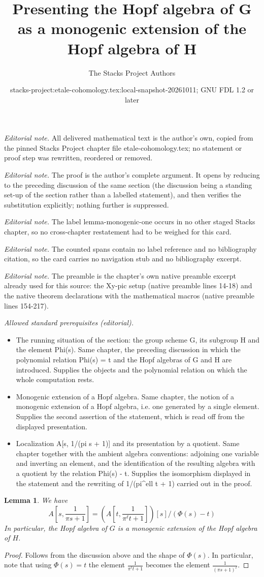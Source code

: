 \documentclass[10pt,a4paper]{amsart}
\title{Presenting the Hopf algebra of G as a monogenic extension of the Hopf algebra of H}
\author{The Stacks Project Authors}
\date{stacks-project:etale-cohomology.tex:local-snapshot-20261011; GNU FDL 1.2 or later}
\theoremstyle{plain}
\newtheorem{lemma}[subsection]{Lemma}
\theoremstyle{definition}
\theoremstyle{remark}
\numberwithin{equation}{subsection}
\begin{document}
\maketitle
\noindent\textit{Editorial note.} All delivered mathematical text is the author's own, copied from the pinned Stacks Project chapter file etale-cohomology.tex; no statement or proof step was rewritten, reordered or removed.\par\medskip
\noindent\textit{Editorial note.} The proof is the author's complete argument. It opens by reducing to the preceding discussion of the same section (the discussion being a standing set-up of the section rather than a labelled statement), and then verifies the substitution explicitly; nothing further is suppressed.\par\medskip
\noindent\textit{Editorial note.} The label lemma-monogenic-one occurs in no other staged Stacks chapter, so no cross-chapter restatement had to be weighed for this card.\par\medskip
\noindent\textit{Editorial note.} The counted spans contain no label reference and no bibliography citation, so the card carries no navigation stub and no bibliography excerpt.\par\medskip
\noindent\textit{Editorial note.} The preamble is the chapter's own native preamble excerpt already used for this source: the Xy-pic setup (native preamble lines 14-18) and the native theorem declarations with the mathematical macros (native preamble lines 154-217).\par\medskip
\noindent\textit{Allowed standard prerequisites (editorial).}\begin{itemize}
\item The running situation of the section: the group scheme G, its subgroup H and the element Phi(s). Same chapter, the preceding discussion in which the polynomial relation Phi(s) = t and the Hopf algebras of G and H are introduced. Supplies the objects and the polynomial relation on which the whole computation rests.
\item Monogenic extension of a Hopf algebra. Same chapter, the notion of a monogenic extension of a Hopf algebra, i.e. one generated by a single element. Supplies the second assertion of the statement, which is read off from the displayed presentation.
\item Localization A[s, 1/(pi s + 1)] and its presentation by a quotient. Same chapter together with the ambient algebra conventions: adjoining one variable and inverting an element, and the identification of the resulting algebra with a quotient by the relation Phi(s) - t. Supplies the isomorphism displayed in the statement and the rewriting of 1/(pi\textasciicircum{}ell t + 1) carried out in the proof.
\end{itemize}\medskip
\begin{lemma}
\label{lemma-monogenic-one}
We have
$$
A[s, \frac{1}{\pi s + 1}] =
\left(A[t, \frac{1}{\pi^\ell t + 1}]\right)[s]/(\Phi(s) - t)
$$
In particular, the Hopf algebra of $G$ is a monogenic extension
of the Hopf algebra of $H$.
\end{lemma}

\begin{proof}
Follows from the discussion above and the shape of $\Phi(s)$.
In particular, note that using $\Phi(s) = t$ the element
$\frac{1}{\pi^\ell t + 1}$ becomes the element
$\frac{1}{(\pi s + 1)^\ell}$.
\end{proof}
\end{document}
